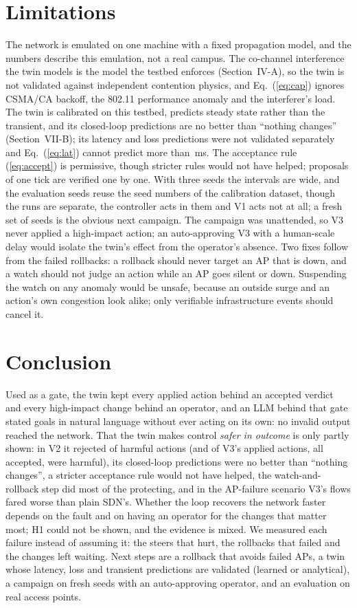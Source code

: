\documentclass[conference]{IEEEtran}
\begin{document}
\section{Limitations}
The network is emulated on one machine with a fixed propagation model, and the numbers describe this emulation, not a real campus. The co-channel interference the twin models is the model the testbed enforces (Section~IV-A), so the twin is not validated against independent contention physics, and Eq.~(\ref{eq:cap}) ignores CSMA/CA backoff, the 802.11 performance anomaly and the interferer's load. The twin is calibrated on this testbed, predicts steady state rather than the transient, and its closed-loop predictions are no better than ``nothing changes'' (Section~VII-B); its latency and loss predictions were not validated separately and Eq.~(\ref{eq:lat}) cannot predict more than \CfgLatCap\,ms. The acceptance rule (\ref{eq:accept}) is permissive, though stricter rules would not have helped; proposals of one tick are verified one by one. With three seeds the intervals are wide, and the evaluation seeds reuse the seed numbers of the calibration dataset, though the runs are separate, the controller acts in them and V1 acts not at all; a fresh set of seeds is the obvious next campaign. The campaign was unattended, so V3 never applied a high-impact action; an auto-approving V3 with a human-scale delay would isolate the twin's effect from the operator's absence. Two fixes follow from the failed rollbacks: a rollback should never target an AP that is down, and a watch should not judge an action while an AP goes silent or down. Suspending the watch on any anomaly would be unsafe, because an outside surge and an action's own congestion look alike; only verifiable infrastructure events should cancel it.

\section{Conclusion}
Used as a gate, the twin kept every applied action behind an accepted verdict and every high-impact change behind an operator, and an LLM behind that gate stated goals in natural language without ever acting on its own: no invalid output reached the network. That the twin makes control \emph{safer in outcome} is only partly shown: in V2 it rejected \HarmRejected{} of \HarmAll{} harmful actions (and \HarmVthree{} of V3's applied actions, all accepted, were harmful), its closed-loop predictions were no better than ``nothing changes'', a stricter acceptance rule would not have helped, the watch-and-rollback step did most of the protecting, and in the AP-failure scenario V3's flows fared worse than plain SDN's. Whether the loop recovers the network faster depends on the fault and on having an operator for the changes that matter most; H1 could not be shown, and the evidence is mixed. We measured each failure instead of assuming it: the steers that hurt, the rollbacks that failed and the changes left waiting. Next steps are a rollback that avoids failed APs, a twin whose latency, loss and transient predictions are validated (learned or analytical), a campaign on fresh seeds with an auto-approving operator, and an evaluation on real access points.
\end{document}

